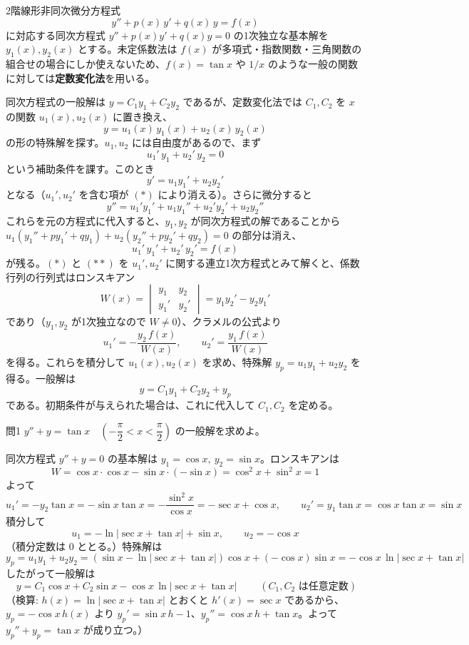 \documentclass[a4paper,11pt]{article}
\begin{document}


\noindent
2階線形非同次微分方程式
\[
y'' + p(x)\,y' + q(x)\,y = f(x)
\]
に対応する同次方程式 $y''+p(x)y'+q(x)y=0$ の1次独立な基本解を $y_{1}(x), y_{2}(x)$ とする。未定係数法は $f(x)$ が多項式・指数関数・三角関数の組合せの場合にしか使えないため、$f(x) = \tan x$ や $1/x$ のような一般の関数に対しては\textbf{定数変化法}を用いる。

同次方程式の一般解は $y = C_{1}y_{1}+C_{2}y_{2}$ であるが、定数変化法では $C_{1}, C_{2}$ を $x$ の関数 $u_{1}(x), u_{2}(x)$ に置き換え、
\[
y = u_{1}(x)\,y_{1}(x) + u_{2}(x)\,y_{2}(x)
\]
の形の特殊解を探す。$u_{1}, u_{2}$ には自由度があるので、まず
\[
u_{1}'\,y_{1} + u_{2}'\,y_{2} = 0 \tag{$*$}
\]
という補助条件を課す。このとき
\[
y' = u_{1}y_{1}' + u_{2}y_{2}'
\]
となる（$u_{1}', u_{2}'$ を含む項が $(*)$ により消える）。さらに微分すると
\[
y'' = u_{1}'y_{1}' + u_{1}y_{1}'' + u_{2}'y_{2}' + u_{2}y_{2}''
\]
これらを元の方程式に代入すると、$y_{1}, y_{2}$ が同次方程式の解であることから $u_{1}(y_{1}''+py_{1}'+qy_{1}) + u_{2}(y_{2}''+py_{2}'+qy_{2}) = 0$ の部分は消え、
\[
u_{1}'\,y_{1}' + u_{2}'\,y_{2}' = f(x) \tag{$**$}
\]
が残る。$(*)$ と $(**)$ を $u_{1}', u_{2}'$ に関する連立1次方程式とみて解くと、係数行列の行列式はロンスキアン
\[
W(x) = \begin{vmatrix} y_{1} & y_{2} \\ y_{1}' & y_{2}' \end{vmatrix} = y_{1}y_{2}' - y_{2}y_{1}'
\]
であり（$y_{1}, y_{2}$ が1次独立なので $W \neq 0$）、クラメルの公式より
\[
u_{1}' = -\frac{y_{2}\,f(x)}{W(x)}, \qquad u_{2}' = \frac{y_{1}\,f(x)}{W(x)}
\]
を得る。これらを積分して $u_{1}(x), u_{2}(x)$ を求め、特殊解 $y_{p} = u_{1}y_{1}+u_{2}y_{2}$ を得る。一般解は
\[
y = C_{1}y_{1} + C_{2}y_{2} + y_{p}
\]
である。初期条件が与えられた場合は、これに代入して $C_{1}, C_{2}$ を定める。

\clearpage
\begin{mondaiboxS}{問1}
$y'' + y = \tan x \quad \left(-\dfrac{\pi}{2} < x < \dfrac{\pi}{2}\right)$ の一般解を求めよ。
\end{mondaiboxS}
\kaitou
同次方程式 $y''+y=0$ の基本解は $y_{1}=\cos x,\ y_{2}=\sin x$。ロンスキアンは
\[
W = \cos x\cdot\cos x - \sin x\cdot(-\sin x) = \cos^{2}x+\sin^{2}x = 1
\]
よって
\[
u_{1}' = -y_{2}\tan x = -\sin x\tan x = -\frac{\sin^{2}x}{\cos x} = -\sec x + \cos x,
\qquad
u_{2}' = y_{1}\tan x = \cos x\tan x = \sin x
\]
積分して
\[
u_{1} = -\ln|\sec x+\tan x| + \sin x, \qquad u_{2} = -\cos x
\]
（積分定数は $0$ ととる。）特殊解は
\[
y_{p} = u_{1}y_{1}+u_{2}y_{2}
= \left(\sin x - \ln|\sec x+\tan x|\right)\cos x + (-\cos x)\sin x
= -\cos x\,\ln|\sec x+\tan x|
\]
したがって一般解は
\[
\boxed{\; y = C_{1}\cos x + C_{2}\sin x - \cos x\,\ln|\sec x+\tan x| \;}
\qquad (C_{1}, C_{2}\text{ は任意定数})
\]
（検算: $h(x)=\ln|\sec x+\tan x|$ とおくと $h'(x)=\sec x$ であるから、$y_{p}=-\cos x\,h(x)$ より $y_{p}'=\sin x\,h-1$、$y_{p}''=\cos x\,h+\tan x$。よって $y_{p}''+y_{p}=\tan x$ が成り立つ。）
\end{document}

